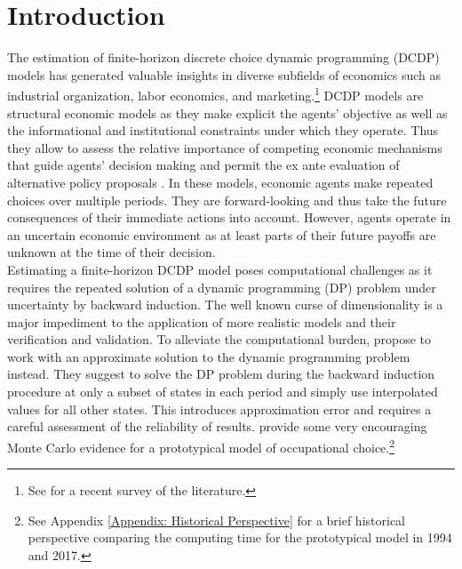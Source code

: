 \section{Introduction}
The estimation of finite-horizon discrete choice dynamic programming (DCDP) models has generated valuable insights in diverse subfields of economics such as industrial organization, labor economics, and marketing.\footnote{See \citet{Keane.2011d} for a recent survey of the literature.} DCDP models are structural economic models as they make explicit the agents' objective as well as the informational and institutional constraints under which they operate. Thus they allow to assess the relative importance of competing economic mechanisms that guide agents' decision making and permit the ex ante evaluation of alternative policy proposals \citep{Wolpin.2013}. In these models, economic agents make repeated choices over multiple periods. They are forward-looking and thus take the future consequences of their immediate actions into account. However, agents operate in an uncertain economic environment as at least parts of their future payoffs are unknown at the time of their decision.\\\newline
%
Estimating a finite-horizon DCDP model poses computational challenges as it requires the repeated solution of a dynamic programming (DP) problem under uncertainty by backward induction. The well known curse of dimensionality \citep{Bellman.1957} is a major impediment to the application of more realistic models and their verification and validation. To alleviate the computational burden, \citet{Keane.1994} propose to work with an approximate solution to the dynamic programming problem instead. They suggest to solve the DP problem during the backward induction procedure at only a subset of states in each period and simply use interpolated values for all other states. This introduces approximation error and requires a careful assessment of the reliability of results. \citet{Keane.1994} provide some very encouraging Monte Carlo evidence for a prototypical model of occupational choice.\footnote{See Appendix \ref{Appendix: Historical Perspective} for a brief historical perspective comparing the computing time for the prototypical model in 1994 and 2017.}\\\newline
%
